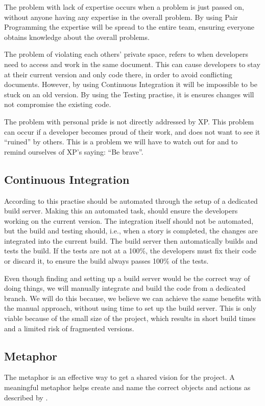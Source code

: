 The problem with lack of expertise occurs when a problem is just passed on, without anyone having any expertise in the overall problem.
By using Pair Programming the expertise will be spread to the entire team, ensuring everyone obtains knowledge about the overall problems.

The problem of violating each others' private space, refers to when developers need to access and work in the same document. This can cause developers to stay at their current version and only code there, in order to avoid conflicting documents.
However, by using Continuous Integration it will be impossible to be stuck on an old version.
By using the Testing practise, it is ensures changes will not compromise the existing code.

The problem with personal pride is not directly addressed by XP.
This problem can occur if a developer becomes proud of their work, and does not want to see it ``ruined'' by others.
This is a problem we will have to watch out for and to remind ourselves of XP's saying: ``Be brave''.
 

\subsection{Continuous Integration}
According to \citet[p. 57]{xp:explored} this practise should be automated through the setup of a dedicated build server.
Making this an automated task, should ensure the developers working on the current version.
The integration itself should not be automated, but the build and testing should, i.e., when a story is completed, the changes are integrated into the current build.
The build server then automatically builds and tests the build.
If the tests are not at a 100\%, the developers must fix their code or discard it, to ensure the build always passes 100\% of the tests.

Even though finding and setting up a build server would be the correct way of doing things, we will manually integrate and build the code from a dedicated branch.
We will do this because, we believe we can achieve the same benefits with the manual approach, without using time to set up the build server.
This is only viable because of the small size of the project, which results in short build times and a limited risk of fragmented versions.

\subsection{Metaphor}
The metaphor is an effective way to get a shared vision for the project.
A meaningful metaphor helps create and name the correct objects and actions as described by \citet[p. 87]{xp:explored}.

